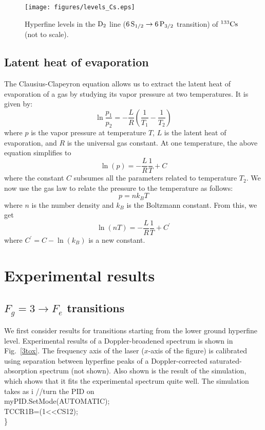 \begin{enumerate}
	\begin{figure}
	\centering
	\texttt{[image: figures/levels\_Cs.eps]}
	\caption{ Hyperfine levels in the $ \rm{D_2} $ line ($ \rm {6\,S_{1/2} \rightarrow 6\,P_{3/2}} $ transition) of $\rm{^{133}Cs} $ (not to scale).}
	\label{levels_Cs}
	\end{figure}
	
	\subsection{Latent heat of evaporation}
	
	The Clausius-Clapeyron equation allows us to extract the latent heat of evaporation of a gas by studying its vapor pressure at two temperatures. It is given by:
	\begin{equation}
	\ln \dfrac{p_1}{p_2} = - \dfrac{L}{R} \left(\dfrac{1}{T_1} - \dfrac{1}{T_2} \right)
	\end{equation}
	where $ p $ is the vapor pressure at temperature $ T $, $ L $ is the latent heat of evaporation, and $ R $ is the universal gas constant. At one temperature, the above equation simplifies to 
	\begin{equation}
	\ln (p) = - \dfrac{L}{R} \dfrac{1}{T} + C
	\end{equation} 
	where the constant $ C $ subsumes all the parameters related to temperature $ T_2 $. We now use the gas law to relate the pressure to the temperature as follows:
	\begin{equation}
	p = n k_B T
	\end{equation}
	where $ n $ is the number density and $ k_B $ is the Boltzmann constant. From this, we get
	\begin{equation}
	\label{nvsT}
	\ln(nT) = - \dfrac{L}{R} \dfrac{1}{T} + {C^{\prime}}
	\end{equation}
	where $ {C^{\prime}} = C - \ln(k_B) $ is a new constant.

\section{Experimental results}
	
	\subsection{$ F_g = 3 \rightarrow F_e $ transitions}
	
	We first consider results for transitions starting from the lower ground hyperfine level. Experimental results of a Doppler-broadened spectrum is shown in Fig.~\ref{3tox}. The frequency axis of the laser ($ x $-axis of the figure) is calibrated using separation between hyperfine peaks of a Doppler-corrected saturated-absorption spectrum (not shown). Also shown is the result of the simulation, which shows that it fits the experimental spectrum quite well. The simulation takes as i	//turn the PID on\\
	myPID.SetMode(AUTOMATIC);\\
	TCCR1B\textbar=(1\textless\textless CS12);\\
\}\\



\end{enumerate}
